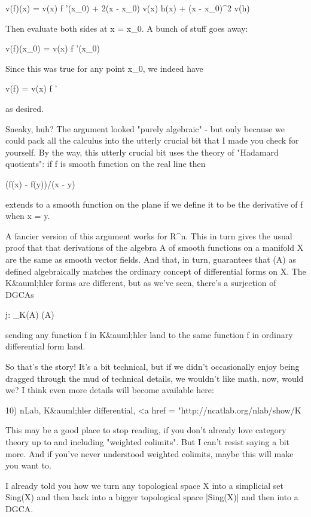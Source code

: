 v(f)(x) = v(x) f '(x_{0}) + 2(x - x_{0}) v(x) h(x) + (x - x_{0})^{2} v(h)  

Then evaluate both sides at x = x_{0}.  A bunch of stuff goes away:

v(f)(x_{0}) = v(x) f '(x_{0})

Since this was true for any point x_{0}, we indeed have

v(f) = v(x) f '

as desired.  

Sneaky, huh?  The argument looked "purely algebraic" - but only
because we could pack all the calculus into the utterly crucial
bit that I made you check for yourself.  By the way, this utterly
crucial bit uses the theory of "Hadamard quotients": if f is 
smooth function on the real line then

(f(x) - f(y))/(x - y)

extends to a smooth function on the plane if we define it to be
the derivative of f when x = y.

A fancier version of this argument works for R^{n}.  This in
turn gives the usual proof that that derivations of the algebra A of
smooth functions on a manifold X are the same as smooth vector fields.
And that, in turn, guarantees that \Omega (A) as defined algebraically
matches the ordinary concept of differential forms on X.  The
K&auml;hler forms are different, but as we've seen, there's a
surjection of DGCAs

j: \Omega _{K}(A) \to  \Omega (A)

sending any function f in K&auml;hler land to the same function f in
ordinary differential form land.  

So that's the story!  It's a bit technical, but if we didn't 
occasionally enjoy being dragged through the mud of technical details,
we wouldn't like math, now, would we?  I think even more details will become 
available here:

10) nLab, K&auml;hler differential,
<a href = "http://ncatlab.org/nlab/show/K%

This may be a good place to stop reading, if you don't already love
category theory up to and including "weighted colimits".  But I can't
resist saying a bit more.  And if you've never understood weighted
colimits, maybe this will make you want to.

I already told you how we turn any topological space X into a
simplicial set Sing(X) and then back into a bigger topological space
|Sing(X)| and then into a DGCA.

